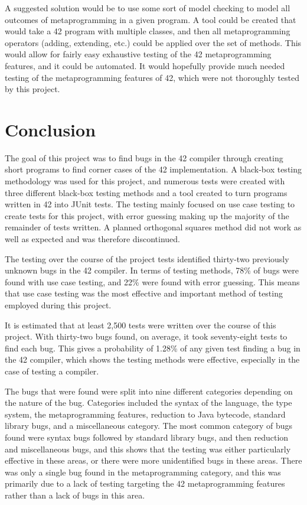 A suggested solution would be to use some sort of model checking to model all outcomes of metaprogramming in a given program. A tool could be created that would take a 42 program with multiple classes, and then all metaprogramming operators (adding, extending, etc.) could be applied over the set of methods. This would allow for fairly easy exhaustive testing of the 42 metaprogramming features, and it could be automated. It would hopefully provide much needed testing of the metaprogramming features of 42, which were not thoroughly tested by this project.

\section{Conclusion}

The goal of this project was to find bugs in the 42 compiler through creating short programs to find corner cases of the 42 implementation. A black-box testing methodology was used for this project, and numerous tests were created with three different black-box testing methods and a tool created to turn programs written in 42 into JUnit tests. The testing mainly focused on use case testing to create tests for this project, with error guessing making up the majority of the remainder of tests written. A planned orthogonal squares method did not work as well as expected and was therefore discontinued.

The testing over the course of the project tests identified thirty-two previously unknown bugs in the 42 compiler. In terms of testing methods, 78\% of bugs were found with use case testing, and 22\% were found with error guessing. This means that use case testing was the most effective and important method of testing employed during this project.

It is estimated that at least 2,500 tests were written over the course of this project. With thirty-two bugs found, on average, it took seventy-eight tests to find each bug. This gives a probability of 1.28\% of any given test finding a bug in the 42 compiler, which shows the testing methods were effective, especially in the case of testing a compiler.

The bugs that were found were split into nine different categories depending on the nature of the bug. Categories included the syntax of the language, the type system, the metaprogramming features, reduction to Java bytecode, standard library bugs, and a miscellaneous category. The most common category of bugs found were syntax bugs followed by standard library bugs, and then reduction and miscellaneous bugs, and this shows that the testing was either particularly effective in these areas, or there were more unidentified bugs in these areas. There was only a single bug found in the metaprogramming category, and this was primarily due to a lack of testing targeting the 42 metaprogramming features rather than a lack of bugs in this area.

